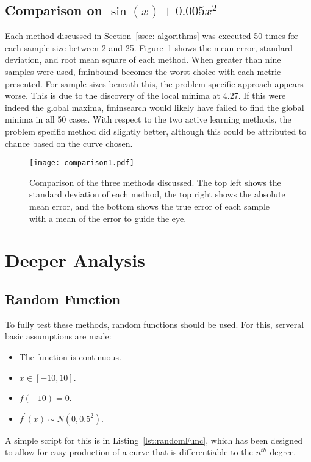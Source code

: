 \subsection[Comparison One]{Comparison on $\sin(x)+0.005x^2$}

Each method discussed in Section~\ref{ssec: algorithms} was executed 50 times for each sample size between 2 and 25. Figure~\ref{fig:firstComparison} shows the mean error, standard deviation, and root mean square of each method. When greater than nine samples were used, fminbound \cite{2020SciPy-NMeth} becomes the worst choice with each metric presented. For sample sizes beneath this, the problem specific approach appears worse. This is due to the discovery of the local minima at $4.27$. If this were indeed the global maxima, fminsearch would likely have failed to find the global minima in all 50 cases. With respect to the two active learning methods, the problem specific method did slightly better, although this could be attributed to chance based on the curve chosen.

\begin{figure}[htbp!] 
  \centering    
  \texttt{[image: comparison1.pdf]}
  \caption[First Comparison]{Comparison of the three methods discussed. The top left shows the standard deviation of each method, the top right shows the absolute mean error, and the bottom shows the true error of each sample with a mean of the error to guide the eye.}
  \label{fig:firstComparison}
\end{figure}

\section{Deeper Analysis}
\subsection{Random Function}
To fully test these methods, random functions should be used. For this, serveral basic assumptions are made:
\begin{itemize}
  \item The function is continuous.
  \item $x\in[-10, 10]$.
  \item $f(-10)=0$.
  \item $f^{\prime}(x)\sim N(0, 0.5^2)$.
\end{itemize}
A simple script for this is in Listing~\ref{lst:randomFunc}, which has been designed to allow for easy production of a curve that is differentiable to the $n^{th}$ degree.

